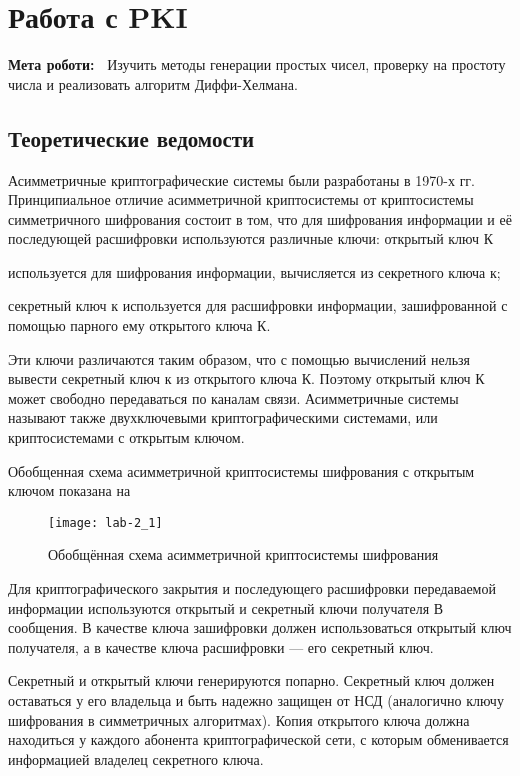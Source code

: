 \chapter{Работа с PKI} \label{chapt2}%
\textbf{Мета роботи:~}%
Изучить методы генерации простых чисел, проверку на простоту числа и
реализовать алгоритм Диффи-Хелмана.
\section{Теоретические ведомости} \label{sect2_a}
Асимметричные криптографические системы были разработаны в 1970-х гг.
Принципиальное отличие асимметричной криптосистемы от криптосистемы
симметричного шифрования состоит в том, что для шифрования информации и её
последующей расшифровки используются различные ключи: открытый ключ К
\begin{Notes}
\item используется для шифрования информации, вычисляется из секретного ключа
    к;
\item секретный ключ к используется для расшифровки информации,
    зашифрованной с помощью парного ему открытого ключа К.
\end{Notes}

Эти ключи различаются таким образом, что с помощью вычислений нельзя вывести
секретный ключ к из открытого ключа К. Поэтому открытый ключ К может свободно
передаваться по каналам связи.
Асимметричные системы называют также
двухключевыми криптографическими системами, или криптосистемами с открытым
ключом.

Обобщенная схема асимметричной криптосистемы шифрования с открытым ключом
показана на 
\begin{figure}[h]
  \centering
  \texttt{[image: lab-2\_1]}
  \caption{Обобщённая схема асимметричной криптосистемы шифрования}\label{img:2_1}
\end{figure}

Для криптографического закрытия и последующего расшифровки передаваемой
информации используются открытый и секретный ключи получателя В сообщения. В
качестве ключа зашифровки должен использоваться открытый ключ получателя, а в
качестве ключа расшифровки — его секретный ключ.

Секретный и открытый ключи генерируются попарно. Секретный ключ должен
оставаться у его владельца и быть надежно защищен от НСД (аналогично ключу
шифрования в симметричных алгоритмах). Копия открытого ключа должна
находиться у каждого абонента криптографической сети, с которым обменивается
информацией владелец секретного ключа.

